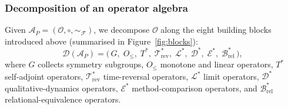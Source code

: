 \documentclass[manuscript]{acmart}
\begin{document}
\subsubsection{Decomposition of an operator algebra}
\label{subsec:decomposition}

Given $\mathcal{A}_P = (\mathcal{O}, \circ, \sim_{\mathcal{F}})$, we decompose $\mathcal{O}$ along the eight building blocks introduced above (summarised in Figure~\ref{fig:blocks}):
$$\mathcal{D}(\mathcal{A}_P) = \bigl(\,G,\; O_{\le},\; T^{*},\; \mathcal{T}^{*}_{\mathrm{rev}},\; \mathcal{L}^{*},\; \mathcal{D}^{*},\; \mathcal{E}^{*},\; \mathcal{B}^{*}_{\mathrm{rel}}\,\bigr),$$
where $G$ collects symmetry subgroups, $O_{\le}$ monotone and linear operators, $T^{*}$ self-adjoint operators, $\mathcal{T}^{*}_{\mathrm{rev}}$ time-reversal operators, $\mathcal{L}^{*}$ limit operators, $\mathcal{D}^{*}$ qualitative-dynamics operators, $\mathcal{E}^{*}$ method-comparison operators, and $\mathcal{B}^{*}_{\mathrm{rel}}$ relational-equivalence operators.
\end{document}
